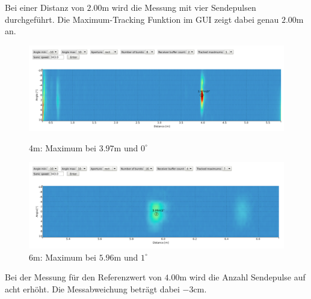Bei einer Distanz von $2.00 \mathrm{m}$ wird die Messung mit vier Sendepulsen durchgeführt. Die Maximum-Tracking Funktion im GUI zeigt dabei genau $2.00 \mathrm{m}$ an.

\clearpage
\begin{figure}[htb]
\begin{minipage}{1.0\textwidth}
\includegraphics[width=\textwidth]{graphics/image_test_distance_04m.png}
\caption{4m: Maximum bei $3.97 \mathrm{m}$ und $0^{\circ}$} %
\label{fig:image_test_distance_04m}
%
\end{minipage}
\begin{minipage}{1.0\textwidth}
\includegraphics[width=\textwidth]{graphics/image_test_distance_06m.png}
\caption{6m: Maximum bei $5.96 \mathrm{m}$ und $1^{\circ}$} %
\label{fig:image_test_distance_06m}
%
\end{minipage}
\end{figure}

Bei der Messung für den Referenzwert von $4.00 \mathrm{m}$ wird die Anzahl Sendepulse auf acht erhöht. Die Messabweichung beträgt dabei $-3 \mathrm{cm}$.


